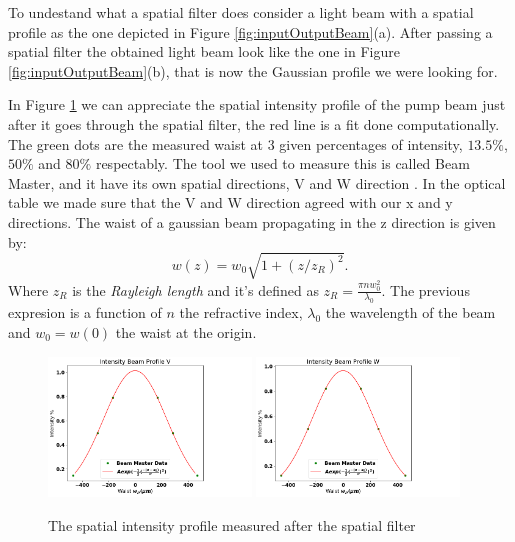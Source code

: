 To undestand what a spatial filter does consider a light beam with a spatial profile as the 
one depicted in Figure \ref{fig:inputOutputBeam}(a). After passing a spatial filter the 
obtained light beam look like the one in Figure \ref{fig:inputOutputBeam}(b), that is 
now the Gaussian profile we were looking for.

In Figure \ref{fig:int} we can appreciate the spatial intensity profile of the pump beam just after 
it goes through the spatial filter, the red line is a fit done computationally. The green dots are the measured waist at 3 given
percentages of intensity, $13.5\%$, $50\%$ and $80\%$ respectably. The tool we used to measure this is called Beam Master, and it have its own spatial directions, V and W direction . 
In the optical table we made sure that the V and W direction agreed with our x and y directions. The waist of a gaussian beam propagating in the z direction is given by\cite{waist}:
\begin{equation}\label{eq:wa}
w(z)=w_0 \sqrt{1+(z/z_R)^2}.
\end{equation}
Where $z_R$ is the \textit{Rayleigh length} and it's defined as $z_R=\frac{\pi n w_0^2}{\lambda_0}$. The previous expresion is a function 
of $n$ the refractive index, $\lambda_0$ the wavelength of the beam and $w_0=w(0)$ the waist at the origin. 
 


\begin{figure}[h!]
\centering
{  \includegraphics[width=0.48\textwidth]{Figures/inteV.png} }
{  \includegraphics[width=0.48\textwidth]{Figures/inteW.png} }
\caption{The spatial intensity profile measured after the spatial filter}
 \label{fig:int}
\end{figure}



